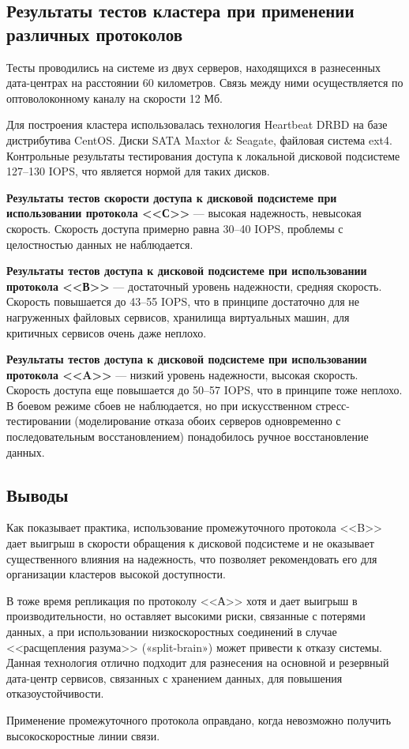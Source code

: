 \documentclass[10pt, a5paper]{article}
\begin{document}
\subsection*{Результаты тестов кластера при применении различных протоколов}

Тесты проводились на системе из двух серверов, находящихся в разнесенных дата-центрах на расстоянии 60 километров. Связь между ними осуществляется по оптоволоконному каналу на скорости 12 Мб.

Для построения кластера использовалась технология Heartbeat DRBD на базе дистрибутива CentOS. Диски SATA Maxtor \& Seagate, файловая система ext4. Контрольные результаты тестирования доступа к локальной дисковой подсистеме 127--130 IOPS, что является нормой для таких дисков.

\textbf{Результаты тестов скорости доступа к дисковой подсистеме при использовании протокола <<С>>} --- высокая надежность, невысокая скорость.
Скорость доступа примерно равна 30--40 IOPS, проблемы с целостностью данных не наблюдается.

\textbf{Результаты тестов доступа к дисковой подсистеме при использовании протокола <<В>>} --- достаточный уровень надежности, средняя скорость.
Скорость повышается до 43--55 IOPS, что в принципе достаточно для не нагруженных файловых сервисов, хранилища виртуальных машин, для критичных сервисов очень даже неплохо.

\textbf{Результаты тестов доступа к дисковой подсистеме при использовании протокола <<A>>} --- низкий уровень надежности, высокая скорость.
Скорость доступа еще повышается до 50--57 IOPS, что в принципе тоже неплохо. В боевом режиме сбоев не наблюдается, но при искусственном стресс-тестировании (моделирование отказа обоих серверов одновременно с последовательным восстановлением) понадобилось ручное восстановление данных.

\subsection*{Выводы}

Как показывает практика, использование промежуточного протокола <<B>> дает выигрыш в скорости обращения к дисковой подсистеме и не оказывает существенного влияния на надежность, что позволяет рекомендовать его для организации кластеров высокой доступности.

В тоже время репликация по протоколу <<А>> хотя и дает выигрыш в производительности, но оставляет высокими риски, связанные с потерями данных, а при использовании низкоскоростных соединений в случае <<расщепления разума>> («split-brain») может привести к отказу системы. Данная технология отлично подходит для разнесения на основной и резервный дата-центр сервисов, связанных с хранением данных, для повышения отказоустойчивости.

Применение промежуточного протокола оправдано, когда невозможно получить высокоскоростные линии связи.
\end{document}
